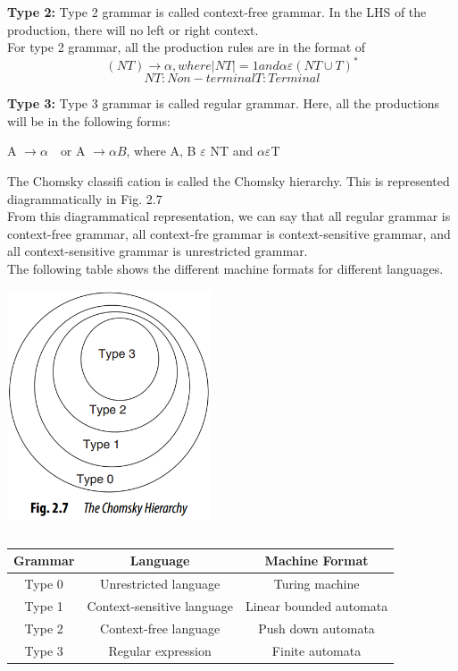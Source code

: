 \documentclass[12pt]{book}
\begin{document}
\textbf{Type 2:} Type 2 grammar is called context-free grammar. In the LHS of the production, there will no left or right context.\\
For type 2 grammar, all the production rules are in the format of\\
\[(NT) \rightarrow \alpha, where |NT| = 1 and \alpha \varepsilon (NT \cup T)^*\]
\[NT : Non-terminal T : Terminal\]
\begin{multicols}{2}
\textbf{Type 3:} Type 3 grammar is called regular grammar. Here, all the productions will be in the following forms:\\
\begin{center}
A $\rightarrow \alpha \quad  $or A $\rightarrow \alpha B$, where A, B $\varepsilon$ NT and $\alpha \varepsilon $T
\end{center}
The Chomsky classifi cation is called the Chomsky hierarchy. 
This is represented diagrammatically in Fig. 2.7\\
From this diagrammatical representation, we can say that all 
regular grammar is context-free grammar, all context-fre grammar is context-sensitive grammar, and all context-sensitive grammar is unrestricted grammar.\\
The following table shows the different machine formats for different languages.\\
\includegraphics[height=7.5cm,width=6cm]{the chomsky hierarchy.jpg}
\end{multicols}
\begin{center}
\begin{tabular}{ccc}
\hline
 Grammar &  Language & Machine Format\\
 \hline
Type 0 & Unrestricted language & Turing machine\\
Type 1 & Context-sensitive language & Linear bounded automata\\
Type 2 & Context-free language & Push down automata\\
Type 3 & Regular expression & Finite automata\\
\hline
\end{tabular}\\
\end{center}
\end{document}
